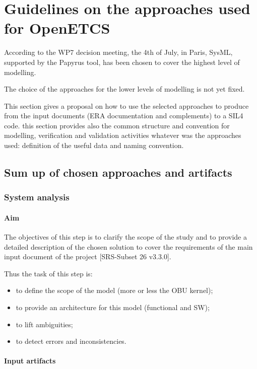 
\section{Guidelines on the approaches used for OpenETCS}


According to  the WP7 decision meeting, the 4th of July, in Paris, SysML, supported by the Papyrus tool,  has been chosen to  cover the highest level of modelling.

The choice of the approaches for the lower levels of modelling is not yet fixed.

This section gives a proposal on how to use the selected approaches to produce from the input documents (ERA documentation and complements)  to a SIL4 code. this section provides also the common structure and convention for modelling, verification and validation activities whatever was the approaches used: definition of the useful data and naming convention.

\subsection{Sum up of chosen approaches and artifacts}

\subsubsection{System analysis}

\paragraph{Aim}
The objectives of this step is to clarify the scope of the study and to provide a detailed description of the chosen solution to cover the requirements of the main input document of the project  [SRS-Subset 26 v3.3.0].

Thus the task of this step  is:
\begin{itemize}
\item to define the scope of the model (more or less the OBU kernel);
\item to provide an architecture for this model (functional and SW);
\item to lift ambiguities;
\item to detect errors and inconsistencies.
\end{itemize}


\paragraph{Input artifacts}

